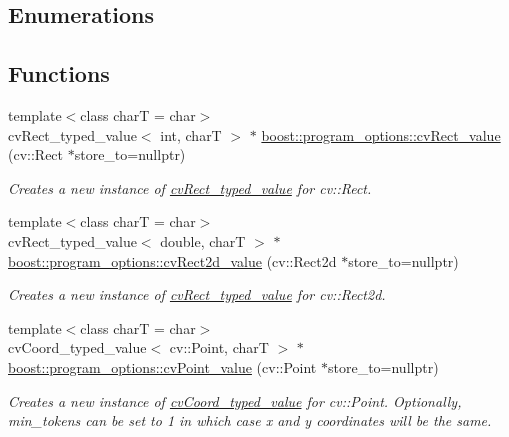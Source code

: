 \subsection*{Enumerations}
\subsection*{Functions}
\begin{DoxyCompactItemize}
\item 
{\footnotesize template$<$class charT  = char$>$ }\\cv\+Rect\+\_\+typed\+\_\+value$<$ int, charT $>$ $\ast$ \hyperlink{group___imagery_module_ga4c86fa93534ee8f020d46b81f7513c8a}{boost\+::program\+\_\+options\+::cv\+Rect\+\_\+value} (cv\+::\+Rect $\ast$store\+\_\+to=nullptr)
\begin{DoxyCompactList}\small\item\em Creates a new instance of \hyperlink{structboost_1_1program__options_1_1cv_rect__typed__value}{cv\+Rect\+\_\+typed\+\_\+value} for cv\+::\+Rect. \end{DoxyCompactList}\item 
{\footnotesize template$<$class charT  = char$>$ }\\cv\+Rect\+\_\+typed\+\_\+value$<$ double, charT $>$ $\ast$ \hyperlink{group___imagery_module_gaa8c37992162927f9717159d47accbc97}{boost\+::program\+\_\+options\+::cv\+Rect2d\+\_\+value} (cv\+::\+Rect2d $\ast$store\+\_\+to=nullptr)
\begin{DoxyCompactList}\small\item\em Creates a new instance of \hyperlink{structboost_1_1program__options_1_1cv_rect__typed__value}{cv\+Rect\+\_\+typed\+\_\+value} for cv\+::\+Rect2d. \end{DoxyCompactList}\item 
{\footnotesize template$<$class charT  = char$>$ }\\cv\+Coord\+\_\+typed\+\_\+value$<$ cv\+::\+Point, charT $>$ $\ast$ \hyperlink{group___imagery_module_ga9a85fe711b2ade00ca9bb9288d405d98}{boost\+::program\+\_\+options\+::cv\+Point\+\_\+value} (cv\+::\+Point $\ast$store\+\_\+to=nullptr)
\begin{DoxyCompactList}\small\item\em Creates a new instance of \hyperlink{structboost_1_1program__options_1_1cv_coord__typed__value}{cv\+Coord\+\_\+typed\+\_\+value} for cv\+::\+Point. Optionally, min\+\_\+tokens can be set to 1 in which case x and y coordinates will be the same. \end{DoxyCompactList}\item 

\end{DoxyCompactItemize}
